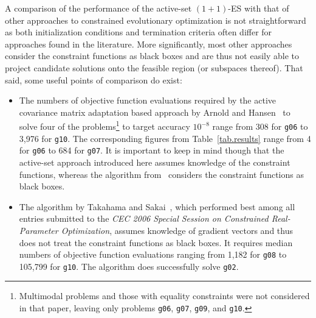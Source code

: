 \documentclass[oribibl]{llncs}
\begin{document}
A comparison of the performance of the active-set $(1+1)$-ES with that of other approaches to constrained evolutionary optimization is not straightforward as both initialization conditions and termination criteria often differ for approaches found in the literature. More significantly, most other approaches consider the constraint functions as black boxes and are thus not easily able to project candidate solutions onto the feasible region (or subspaces thereof). That said, some useful points of comparison do exist:
\begin{itemize}
  \item The numbers of objective function evaluations required by the active covariance matrix adaptation based approach by Arnold and Hansen~\cite{arnold12a} to solve four of the problems\footnote{Multimodal problems and those with equality constraints were not considered in that paper, leaving only problems \texttt{g06}, \texttt{g07}, \texttt{g09}, and \texttt{g10}.} to target accuracy $10^{-8}$ range from 308 for \texttt{g06} to 3,{}976 for \texttt{g10}. The corresponding figures from Table~\ref{tab.results} range from 4 for \texttt{g06} to 684 for \texttt{g07}. It is important to keep in mind though that the active-set approach introduced here assumes knowledge of the constraint functions, whereas the algorithm from~\cite{arnold12a} considers the constraint functions as black boxes. 
  \item The algorithm by Takahama and Sakai~\cite{TS06}, which performed best among all entries submitted to the \textsl{CEC 2006 Special Session on Constrained Real-Parameter Optimization}, assumes knowledge of gradient vectors and thus does not treat the constraint functions as black boxes. It requires median numbers of objective function evaluations ranging from 1,{}182 for \texttt{g08} to 105,{}799 for \texttt{g10}. The algorithm does successfully solve \texttt{g02}.

\end{itemize}
\end{document}
